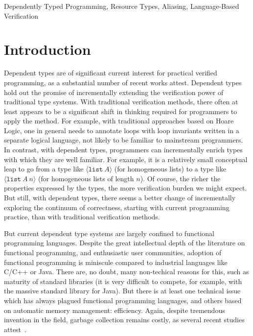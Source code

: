\documentclass[9pt,natbib]{sigplanconf}
\begin{document}
\keywords
Dependently Typed Programming, Resource Types, Aliasing, Language-Based Verification

\section{Introduction}

Dependent types are of significant current interest for practical
verified programming, as a substantial number of recent works attest.
Dependent types hold out the promise of incrementally extending the
verification power of traditional type systems.  With traditional
verification methods, there often at least appears to be a significant
shift in thinking required for programmers to apply the method.  For
example, with traditional approaches based on Hoare Logic, one in
general needs to annotate loops with loop invariants written in a
separate logical language, not likely to be familiar to mainstream
programmers.  In contrast, with dependent types, programmers can
incrementally enrich types with which they are well familiar.  For
example, it is a relatively small conceptual leap to go from a type
like $\langle \texttt{list}\ A\rangle$ (for homogeneous lists) to a
type like $\langle \texttt{list}\ A\ n\rangle$ (for homogeneous lists
of length $n$).  Of course, the richer the properties expressed by the
types, the more verification burden we might expect.  But still, with
dependent types, there seems a better change of incrementally
exploring the continuum of correctness, starting with current
programming practice, than with traditional verification methods.

But current dependent type systems are largely confined to functional
programming languages.  Despite the great intellectual depth of the
literature on functional programming, and enthusiastic user
communities, adoption of functional programming is miniscule compared
to industrial languages like C/C++ or Java.  There are, no doubt, many
non-techical reasons for this, such as maturity of standard libraries
(it is very difficult to compete, for example, with the massive
standard library for Java).  But there is at least one technical issue
which has always plagued functional programming languages, and others
based on automatic memory management: efficiency.  Again, despite
tremendous invention in the field, garbage collection remains costly,
as several recent studies attest~\cite{Xian2008,hertz+05}.
\end{document}
